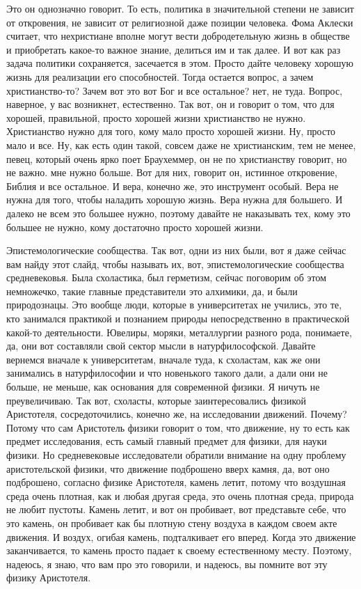 Это он однозначно говорит. То есть, политика в значительной степени не зависит
от откровения, не зависит от религиозной даже позиции человека. Фома Аклески
считает, что нехристиане вполне могут вести добродетельную жизнь в обществе и
приобретать какое-то важное знание, делиться им и так далее. И вот как раз
задача политики сохраняется, засечается в этом. Просто дайте человеку хорошую
жизнь для реализации его способностей. Тогда остается вопрос, а зачем
христианство-то? Зачем вот это вот Бог и все остальное? нет, не туда. Вопрос,
наверное, у вас возникнет, естественно. Так вот, он и говорит о том, что для
хорошей, правильной, просто хорошей жизни христианство не нужно. Христианство
нужно для того, кому мало просто хорошей жизни. Ну, просто мало и все. Ну, как
есть один такой, совсем даже не христианским, тем не менее, певец, который очень
ярко поет Браухеммер, он не по христианству говорит, но не важно. мне нужно
больше. Вот для них, говорит он, истинное откровение, Библия и все остальное. И
вера, конечно же, это инструмент особый. Вера не нужна для того, чтобы наладить
хорошую жизнь. Вера нужна для большего. И далеко не всем это большее нужно,
поэтому давайте не наказывать тех, кому это большее не нужно, кому достаточно
просто хорошей жизни. 

Эпистемологические сообщества. Так вот, одни из
них были, вот я даже сейчас вам найду этот слайд, чтобы называть их, вот,
эпистемологические сообщества средневековья. Была схоластика, был герметизм,
сейчас поговорим об этом немножечко, такие главные представители это алхимики,
да, и были природознацы. Это вообще люди, которые в университетах не учились,
это те, кто занимался практикой и познанием природы непосредственно в
практической какой-то деятельности. Ювелиры, моряки, металлургии разного рода,
понимаете, да, они вот составляли свой сектор мысли в натурфилософской. Давайте
вернемся вначале к университетам, вначале туда, к схоластам, как же они
занимались в натурфилософии и что новенького такого дали, а дали они не больше,
не меньше, как основания для современной физики. Я ничуть не преувеличиваю. Так
вот, схоласты, которые заинтересовались физикой Аристотеля, сосредоточились,
конечно же, на исследовании движений. Почему? Потому что сам Аристотель физики
говорит о том, что движение, ну то есть как предмет исследования, есть самый
главный предмет для физики, для науки физики. Но средневековые исследователи
обратили внимание на одну проблему аристотельской физики, что движение
подброшено вверх камня, да, вот оно подброшено, согласно физике Аристотеля,
камень летит, потому что воздушная среда очень плотная, как и любая другая
среда, это очень плотная среда, природа не любит пустоты. Камень летит, и вот он
пробивает, вот представьте себе, что это камень, он пробивает как бы плотную
стену воздуха в каждом своем акте движения. И воздух, огибая камень,
подталкивает его вперед. Когда это движение заканчивается, то камень просто
падает к своему естественному месту. Поэтому, надеюсь, я знаю, что вам про это
говорили, и надеюсь, вы помните вот эту физику Аристотеля. 

